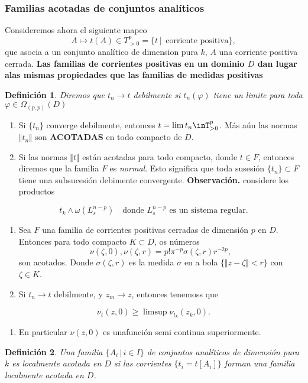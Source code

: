 \documentclass[letterpaper]{article}
\newtheorem{def.}{Definici\'on}[section]
\newcommand{\obs}{{\newline \noindent \sc \textbf{Observación. }}}
\newcommand{\om}{\ensuremath{\Omega}}
\begin{document}
\subsubsection{Familias acotadas de conjuntos analíticos}
\label{sec:org50c0940}
Consideremos ahora el siguiente mapeo
\[
    A\mapsto t(A)\in T^p_{>0}=\{t\,|\,\text{ corriente positiva}\},
\]
\noindent que asocia a un conjunto analítico de dimension pura \(k\), \(A\) una corriente positiva cerrada.
\textbf{Las familias de corrientes positivas en un dominio \(D\) dan lugar alas mismas propiedades que las familias de medidas positivas}
\begin{def.}
Diremos que \(t_n\rightarrow t\) \emph{debilmente} si \(t_n(\varphi)\) tiene un limite para toda \(\varphi\in\om_(p,p)(D)\)
\end{def.}

\begin{enumerate}
\item Si \(\{t_n\}\) converge debilmente, entonces \(t=\lim t_n\inT^p_{>0}\). Más aún las normas \(\Vert t_n\Vert\) son \textbf{ACOTADAS} en todo compacto de \(D\).
\item Si las normas \(\Vert t\Vert\) están acotadas para todo compacto, donde \(t\in F\), entonces diremos que la familia \(F\) es \emph{normal}. Esto significa que toda susesión \(\{t_n\}\subset F\) tiene una subsucesión debimente convergente.
\obs considere los productos
\end{enumerate}
\[
    t_k\wedge\omega(L^{n-p}_s)\quad\text{donde }L^{n-p}_s\text{ es un sistema regular}.
\]
\begin{enumerate}
\item Sea \(F\) una familia de corrientes positivas cerradas de dimensión \(p\) en \(D\). Entonces para todo compacto \(K\subset D\), os números
\[
        \nu(\zeta,0),\nu(\zeta,r)=p!\pi^{-p}\sigma(\zeta,r)r^{-2p},
   \]
\noindent son acotados. Donde \(\sigma(\zeta,r)\) es la medida \(\sigma\) en a bola \(\{\Vert z-\zeta\Vert<r\}\) con \(\zeta\in K\).
\item Si \(t_n\rightarrow t\) debilmente, y \(z_m\rightarrow z\), entonces tenemoss que
\end{enumerate}
\begin{equation}
        \nu_t(z,0)\geq\limsup\nu_{t_k}(z_k,0).
\end{equation}
\begin{enumerate}
\item En particular \(\nu(z,0)\) es unafunción semi continua superiormente.
\end{enumerate}
\begin{def.}
Una familia \(\{A_i\,|\,i\in I\}\) de conjuntos analíticos de dimensión pura \(k\) es localmente acotada en \(D\) si las corrientes \(\{t_i=t[A_i]\}\) forman una familia localmente acotada en \(D\).
\end{def.}
\end{document}
